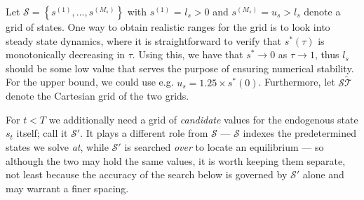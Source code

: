 \documentclass[a4paper]{article}
\begin{document}
 Let $\mathcal{S} = \left\lbrace s^{(1)}, ..., s^{(M_s)} \right\rbrace$ with $s^{(1)}$ = $l_s>0$ and $s^{(M_s)} = u_s>l_s$ denote a grid of states. One way to obtain realistic ranges for the grid is to look into steady state dynamics, where it is straightforward to verify that $s^*(\tau)$ is monotonically decreasing in $\tau$. Using this, we have that $s^* \rightarrow 0$ as $\tau \rightarrow 1$, thus $l_s$ should be some low value that serves the purpose of ensuring numerical stability. For the upper bound, we could use e.g. $u_s = 1.25 \times s^*(0)$. Furthermore, let $\mathcal{S\tilde{T}}$ denote the Cartesian grid of the two grids.

For $t<T$ we additionally need a grid of \emph{candidate} values for the endogenous state $s_t$ itself; call it $\mathcal{S}'$. It plays a different role from $\mathcal{S}$ --- $\mathcal{S}$ indexes the predetermined states we solve \emph{at}, while $\mathcal{S}'$ is searched \emph{over} to locate an equilibrium --- so although the two may hold the same values, it is worth keeping them separate, not least because the accuracy of the search below is governed by $\mathcal{S}'$ alone and may warrant a finer spacing.
\end{document}
